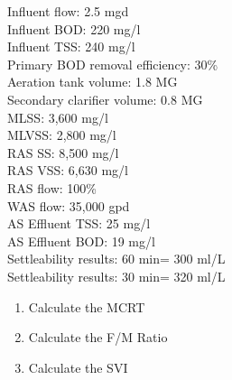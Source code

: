 \begin{enumerate}
Influent flow: 2.5 mgd\\
Influent BOD: 220 mg/l\\
Influent TSS: 240 mg/l\\
Primary BOD removal efficiency: 30\%\\
Aeration tank volume: 1.8 MG\\
Secondary clarifier volume: 0.8 MG\\
MLSS: 3,600 mg/l\\
MLVSS: 2,800 mg/l\\
RAS SS: 8,500 mg/l\\
RAS VSS: 6,630 mg/l\\
RAS flow: 100\%\\
WAS flow: 35,000 gpd\\
AS Effluent TSS: 25 mg/l\\
AS Effluent BOD: 19 mg/l\\
Settleability results: 60 min= 300 ml/L\\
Settleability results: 30 min= 320 ml/L\\

\begin{enumerate}
\item Calculate the MCRT
\item Calculate the F/M Ratio
\item Calculate the SVI
\end{enumerate}


\end{enumerate}
